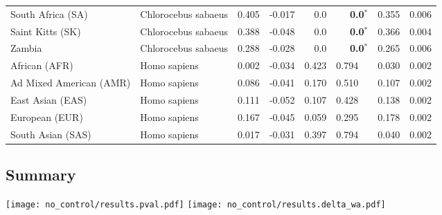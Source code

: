 \begin{center}
\begin{adjustbox}{width = 1\textwidth}
\begin{tabular}{|l|l|r|r|r|r|r|r|}
              South Africa (SA) &  Chlorocebus sabaeus &                                              0.405 &                                             -0.017 &              0.0 &                    \textbf{0.0}$\bm{^*}$ &                                              0.355 &              0.006 \\
               Saint Kitts (SK) &  Chlorocebus sabaeus &                                              0.388 &                                             -0.048 &              0.0 &                    \textbf{0.0}$\bm{^*}$ &                                              0.366 &              0.004 \\
                         Zambia &  Chlorocebus sabaeus &                                              0.288 &                                             -0.028 &              0.0 &                    \textbf{0.0}$\bm{^*}$ &                                              0.265 &              0.006 \\
                  African (AFR) &         Homo sapiens &                                              0.002 &                                             -0.034 &            0.423 &                         0.794~~ &                                              0.030 &              0.002 \\
        Ad Mixed American (AMR) &         Homo sapiens &                                              0.086 &                                             -0.041 &            0.170 &                         0.510~~ &                                              0.107 &              0.002 \\
               East Asian (EAS) &         Homo sapiens &                                              0.111 &                                             -0.052 &            0.107 &                         0.428~~ &                                              0.138 &              0.002 \\
                 European (EUR) &         Homo sapiens &                                              0.167 &                                             -0.045 &            0.059 &                         0.295~~ &                                              0.178 &              0.002 \\
              South Asian (SAS) &         Homo sapiens &                                              0.017 &                                             -0.031 &            0.397 &                         0.794~~ &                                              0.040 &              0.002 \\
\bottomrule
\end{tabular}
\end{adjustbox}
\newpage
\end{center}

\subsection{Summary}
\begin{center}
    \texttt{[image: no\_control/results.pval.pdf]}
    \texttt{[image: no\_control/results.delta\_wa.pdf]}
\end{center}